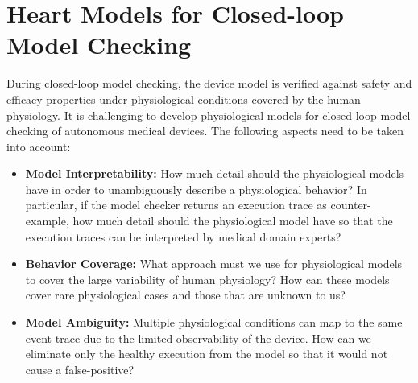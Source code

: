 \section{Heart Models for Closed-loop Model Checking}
During closed-loop model checking, the device model is verified against safety and efficacy properties under physiological conditions covered by the human physiology. 
It is challenging to develop physiological models for closed-loop model checking of autonomous medical devices.
The following aspects need to be taken into account:
\begin{itemize}
\item \textbf{Model Interpretability: } How much detail should the physiological models have in order to unambiguously describe a physiological behavior? In particular, if the model checker returns an execution trace as counter-example, how much detail should the physiological model have so that the execution traces can be interpreted by medical domain experts? 	
	\item \textbf{Behavior Coverage:} What approach must we use for physiological models to cover the large variability of human physiology? How can these models cover rare physiological cases and those that are unknown to us?

	\item \textbf{Model Ambiguity: } Multiple physiological conditions can map to the same event trace due to the limited observability of the device. How can we eliminate only the healthy execution from the model so that it would not cause a false-positive?
	\end{itemize}

